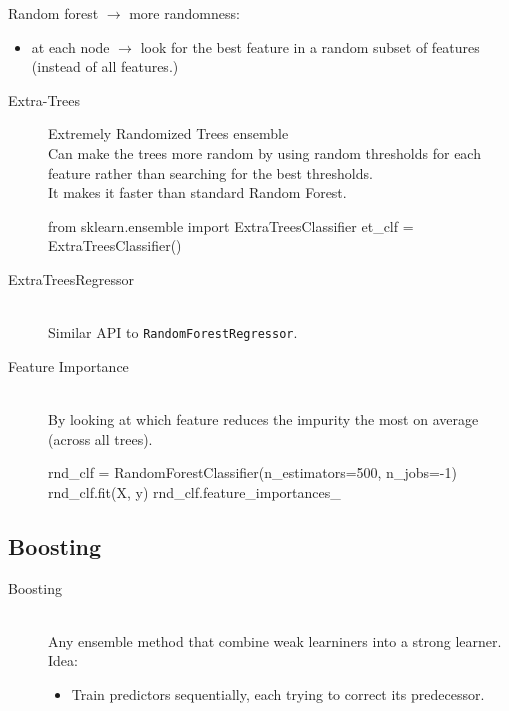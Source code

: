 Random forest $\rightarrow$ more randomness:
\begin{itemize}
    \item at each node $\rightarrow$ look for the best feature in a random subset of features (instead of all features.)
\end{itemize}

\begin{description}
    \item[Extra-Trees] Extremely Randomized Trees ensemble \hfill\\
        Can make the trees more random by using random thresholds for each feature rather than searching for the best thresholds.\\
        It makes it faster than standard Random Forest.
        \begin{python}
            from sklearn.ensemble import ExtraTreesClassifier
            et_clf = ExtraTreesClassifier()
        \end{python}
    \item[ExtraTreesRegressor] \hfill\\
        Similar API to \verb;RandomForestRegressor;.
    \item[Feature Importance] \hfill\\
        By looking at which feature reduces the impurity the most on average (across all trees).
        \begin{python}
            rnd_clf = RandomForestClassifier(n_estimators=500, n_jobs=-1)
            rnd_clf.fit(X, y)
            rnd_clf.feature_importances_
        \end{python}
\end{description}


\subsection{Boosting}
\begin{description}
    \item[Boosting] \hfill\\
    Any ensemble method that combine weak learniners into a strong learner.\\
    Idea:
    \begin{itemize}
        \item Train predictors sequentially, each trying to correct its predecessor.
    \end{itemize}
\end{description}

